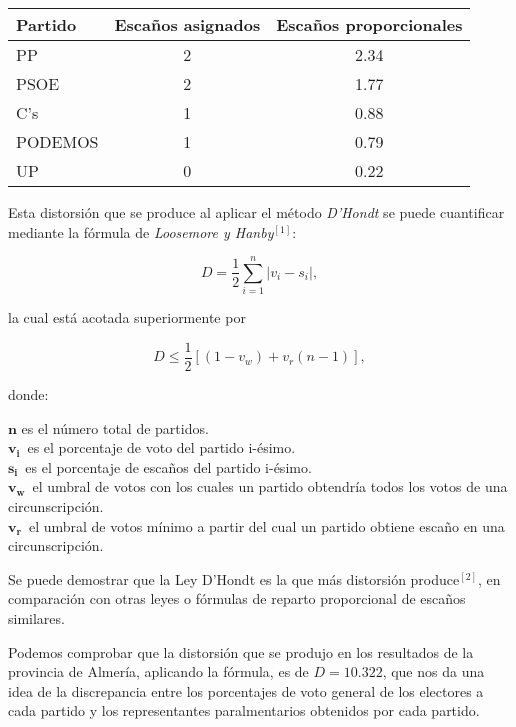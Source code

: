 \documentclass[11pt]{article}
\newcommand\console[1]{{\inconsolata #1}}
\begin{document}
	 \console{
	 
	 \begin{center}
	 \begin{tabular}{l|c|c}
	 \textbf{Partido} & \textbf{Escaños asignados} & \textbf{Escaños proporcionales}\\
	 \hline
	 PP & 2 & 2.34\\
	 PSOE & 2 & 1.77\\
	 C's & 1 & 0.88\\
	 PODEMOS & 1 & 0.79\\
	 UP & 0 & 0.22
	 \end{tabular}
	 \end{center}
	 }
	 	 
	 Esta distorsión que se produce al aplicar el método \textit{D'Hondt} se puede cuantificar mediante la fórmula de \textit{Loosemore y Hanby}$^{[1]}$:
	 
	 \vspace{-0.5em}
	 $$D = \frac{1}{2} \sum_{i=1}^n |v_i - s_i|,$$
	 
	 \vspace{-0.5em}
	 la cual está acotada superiormente por
	 
	 \vspace{-0.5em}
	 $$D \le \frac{1}{2} \left[ (1 - v_w) + v_r(n-1) \right],$$
	 
	 \vspace{-0.5em}
	 donde:
	 
	  $\boldsymbol{n}$ es el número total de partidos.\\
  $\displaystyle \boldsymbol{v_{i}}\,$  es el porcentaje de voto del partido i-ésimo.\\
  $\displaystyle \boldsymbol{s_{i}}\,$  es el porcentaje de escaños del partido i-ésimo.\\
  $\displaystyle \boldsymbol{v_{w}}\,$  el umbral de votos con los cuales un partido obtendría todos los votos de una circunscripción.\\
  $\displaystyle \boldsymbol{v_{r}}\,$  el umbral de votos mínimo a partir del cual un partido obtiene escaño en una circunscripción.
	 
	 Se puede demostrar que la Ley D'Hondt es la que más distorsión produce$^{[2]}$, en comparación con otras leyes o fórmulas de reparto proporcional de escaños similares.
	 
	 Podemos comprobar que la distorsión que se produjo en los resultados de la provincia de Almería, aplicando la fórmula, es de $D = 10.322$, que nos da una idea de la discrepancia entre los porcentajes de voto general de los electores a cada partido y los representantes paralmentarios obtenidos por cada partido.
\end{document}
